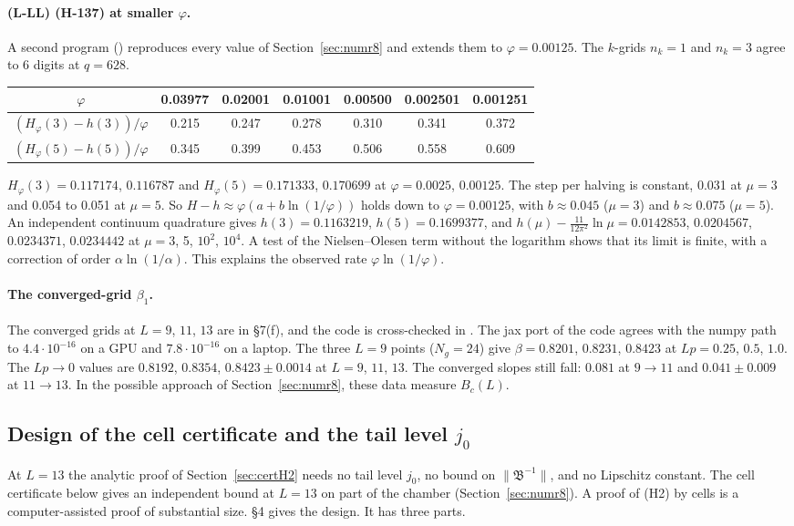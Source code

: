 \paragraph{(L-LL) (H-137) at smaller $\varphi$.} A second program () reproduces every value of Section~\ref{sec:numr8} and extends them to $\varphi=0.00125$. The $k$-grids $n_k=1$ and $n_k=3$ agree to 6 digits at $q=628$.
\begin{longtable}{|c|c|c|c|c|c|c|}
\hline
$\varphi$ & 0.03977 & 0.02001 & 0.01001 & 0.00500 & 0.002501 & 0.001251 \\ \hline
$(H_\varphi(3)-h(3))/\varphi$ & 0.215 & 0.247 & 0.278 & 0.310 & 0.341 & 0.372 \\ \hline
$(H_\varphi(5)-h(5))/\varphi$ & 0.345 & 0.399 & 0.453 & 0.506 & 0.558 & 0.609 \\ \hline
\end{longtable}
$H_\varphi(3)=0.117174$, $0.116787$ and $H_\varphi(5)=0.171333$, $0.170699$ at $\varphi=0.0025$, $0.00125$. The step per halving is constant, 0.031 at $\mu=3$ and 0.054 to 0.051 at $\mu=5$. So $H-h\approx\varphi(a+b\ln(1/\varphi))$ holds down to $\varphi=0.00125$, with $b\approx0.045$ ($\mu=3$) and $b\approx0.075$ ($\mu=5$). An independent continuum quadrature gives $h(3)=0.1163219$, $h(5)=0.1699377$, and $h(\mu)-\frac{11}{12\pi^2}\ln\mu=0.0142853$, $0.0204567$, $0.0234371$, $0.0234442$ at $\mu=3$, 5, $10^2$, $10^4$. A test of the Nielsen--Olesen term without the logarithm shows that its limit is finite, with a correction of order $\alpha\ln(1/\alpha)$. This explains the observed rate $\varphi\ln(1/\varphi)$.

\paragraph{The converged-grid $\beta_1$.} The converged grids at $L=9$, $11$, $13$ are in  \S7(f), and the code is cross-checked in . The jax port of the code agrees with the numpy path to $4.4\cdot10^{-16}$ on a GPU and $7.8\cdot10^{-16}$ on a laptop. The three $L=9$ points ($N_g=24$) give $\beta=0.8201$, $0.8231$, $0.8423$ at $Lp=0.25$, $0.5$, $1.0$. The $Lp\to0$ values are $0.8192$, $0.8354$, $0.8423\pm0.0014$ at $L=9$, $11$, $13$. The converged slopes still fall: $0.081$ at $9\to11$ and $0.041\pm0.009$ at $11\to13$. In the possible approach of Section~\ref{sec:numr8}, these data measure $B_c(L)$.

\subsection{Design of the cell certificate and the tail level $j_0$}\label{sec:cert}
At $L=13$ the analytic proof of Section~\ref{sec:certH2} needs no tail level $j_0$, no bound on $\|\mathfrak B^{-1}\|$, and no Lipschitz constant. The cell certificate below gives an independent bound at $L=13$ on part of the chamber (Section~\ref{sec:numr8}). A proof of (H2) by cells is a computer-assisted proof of substantial size.  \S4 gives the design. It has three parts.

